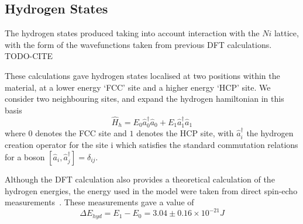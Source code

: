 \subsection{Hydrogen States}
The hydrogen states produced
taking into account interaction with
the \(Ni\) lattice, with the form
of the wavefunctions taken
from previous DFT calculations. TODO-CITE

These calculations gave hydrogen
states localised at two positions
within the material, at a lower energy
`FCC' site and a higher energy
`HCP' site. We consider two neighbouring
sites, and expand the hydrogen
hamiltonian in this basis
\begin{equation}
    \hat{H}_{h} =
    E_0 \hat{a}^\dagger_0 \hat{a}_0
    + E_1 \hat{a}^\dagger_1 \hat{a}_1
\end{equation}
where \(0\) denotes the FCC site and \(1\)
denotes the HCP site,
with \(\hat{a}^\dagger_i\) the hydrogen creation
operator for the site i
which satisfies the standard commutation
relations for a boson
\(\left[ \hat{a}_i, \hat{a}^\dagger_j \right]
= \delta_{ij}\).

Although the DFT calculation
also provides a theoretical calculation
of the hydrogen energies, the
energy used in the
model were
taken from direct spin-echo measurements~\cite{Jianding-Zhu}.
These measurements gave a value of
\begin{equation}
    \Delta{}E_{hyd} = E_1 - E_0
    = 3.04\pm0.16\times{}10^{-21} J
    \label{eqn:hydrogen energy difference}
\end{equation}


